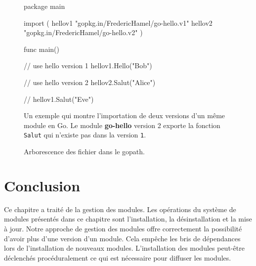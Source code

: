 \begin{figure}[h]
\begin{mplisting}{1}
package main

import (
  hellov1 "gopkg.in/FredericHamel/go-hello.v1"
  hellov2 "gopkg.in/FredericHamel/go-hello.v2"
)

func main() {
  // use hello version 1
  hellov1.Hello("Bob")

  // use hello version 2
  hellov2.Salut("Alice")

  // hellov1.Salut("Eve")
}
\end{mplisting}
  \caption{Un exemple qui montre l'importation de deux versions d'un même module
    en Go. Le module \textbf{go-hello} version 2 exporte la fonction \texttt{Salut}
    qui n'existe pas dans la version \texttt{1}.}
\end{figure}


\begin{figure}[ht]
  \centering
  \lstset{frame=single}
  \caption{Arborescence des fichier dans le gopath.}
  \label{fig:organisation_go}
\end{figure}

\section{Conclusion}
%
Ce chapitre a traité de la gestion des modules.  Les opérations du système de
modules présentés dans ce chapitre sont l'installation, la désinstallation et
la mise à jour.  Notre approche de gestion des modules offre correctement la
possibilité d'avoir plus d'une version d'un module. Cela empêche les bris de
dépendances lors de l'installation de nouveaux modules.  L'installation des
modules peut-être déclenchés procéduralement ce qui est nécessaire pour diffuser
les modules.


